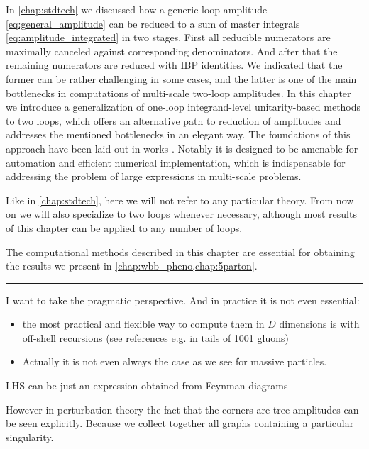 In \cref{chap:stdtech} we discussed how a generic loop amplitude \eqref{eq:general_amplitude} can be reduced
to a sum of master integrals \eqref{eq:amplitude_integrated} in two stages.
First all reducible numerators are maximally canceled against corresponding denominators.
And after that the remaining numerators are reduced with IBP identities.
We indicated that the former can be rather challenging in some cases,
and the latter is one of the main bottlenecks in computations of
multi-scale two-loop amplitudes.
In this chapter we introduce a generalization of one-loop integrand-level unitarity-based methods \cite{Ossola:2006us,Giele:2008ve,Ellis:2008ir}
to two loops, which offers an alternative path to reduction of amplitudes and addresses the mentioned bottlenecks in an elegant way.
The foundations of this approach have been laid out in works \cite{Ita:2015tya,Abreu:2017xsl,Abreu:2017hqn}.
Notably it is designed to be amenable for automation and efficient numerical implementation, which is indispensable
for addressing the problem of large expressions in multi-scale problems.

Like in \cref{chap:stdtech}, here we will not refer to any particular theory.
From now on we will also specialize to two loops whenever necessary,
although most results of this chapter
can be applied to any number of loops.

The computational methods described in this chapter are essential for obtaining the results we present in \cref{chap:wbb_pheno,chap:5parton}.

\hrule

I want to take the pragmatic perspective. And in practice it is not even essential:
\begin{itemize}
    \item       the most practical and flexible way to compute them in $D$ dimensions is with off-shell recursions (see references e.g. in tails of 1001 gluons)
    \item Actually it is not even always the case as we see for massive particles.
\end{itemize}

LHS can be just an expression obtained from Feynman diagrams

However in perturbation theory the fact that the corners are tree amplitudes can be seen explicitly.
Because we collect together all graphs containing a particular singularity.

